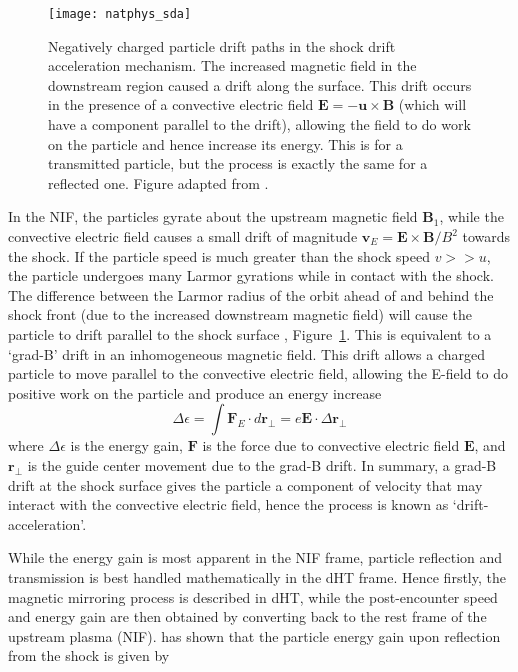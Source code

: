 \begin{figure}[!t] 
\begin{center}
\texttt{[image: natphys\_sda]}
\caption[Shock drift acceleration]{Negatively charged particle drift paths in the shock drift acceleration mechanism. The increased magnetic field in the downstream region caused a drift along the surface. This drift occurs in the presence of a convective electric field $\mathbf{E}=-\mathbf{u} \times \mathbf{B}$ (which will have a component parallel to the drift), allowing the field to do work on the particle and hence increase its energy. This is for a transmitted particle, but the process is exactly the same for a reflected one. Figure adapted from \citep{richardson2013}.}
\label{fig:sda}
\end{center}
\end{figure}
In the NIF, the particles gyrate about the upstream magnetic field $\mathbf{B}_1$, while the convective electric field causes a small drift of magnitude $\mathbf{v}_E = \mathbf{E}\times \mathbf{B}/B^2$ towards the shock. If the particle speed is much greater than the shock speed $v>>u$, the particle undergoes many Larmor gyrations while in contact with the shock. The difference between the Larmor radius of the orbit ahead of and behind the shock front (due to the increased downstream magnetic field) will cause the particle to drift parallel to the shock surface \citep{ball2001, toptychin1980}, Figure~\ref{fig:sda}. This is equivalent to a `grad-B' drift in an inhomogeneous magnetic field. This drift allows a charged particle to move parallel to the convective electric field, allowing the E-field to do positive work on the particle and produce an energy increase \citep{lever2001}
\begin{equation}
\Delta \epsilon = \int \mathbf{F}_E\cdot d{\mathbf{r_{\perp}}} = e\mathbf{E}\cdot\Delta \mathbf{r_{\perp}}
\end{equation}
where $\Delta \epsilon$ is the energy gain, $\mathbf{F}$ is the force due to convective electric field $\mathbf{E}$, and $\mathbf{r_{\perp}}$ is the guide center movement due to the grad-B drift. In summary, a grad-B drift at the shock surface gives the particle a component of velocity that may interact with the convective electric field, hence the process is known as \textquoteleft drift-acceleration'.


While the energy gain is most apparent in the NIF frame, particle reflection and transmission is best handled mathematically in the dHT frame. Hence firstly, the magnetic mirroring process is described in dHT, while the post-encounter speed and energy gain are then obtained by converting back to the rest frame of the upstream plasma (NIF). \citet{ball2001} has shown that the particle energy gain upon reflection from the shock is given by 

